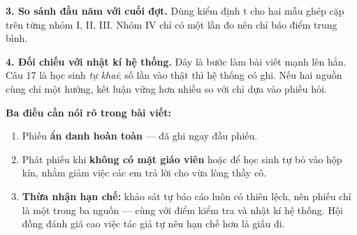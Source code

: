 \documentclass[12pt,a4paper]{article}
\begin{document}
\textbf{3. So sánh đầu năm với cuối đợt.} Dùng kiểm định t cho hai mẫu ghép cặp
trên từng nhóm I, II, III. Nhóm IV chỉ có một lần đo nên chỉ báo điểm trung
bình.

\textbf{4. Đối chiếu với nhật kí hệ thống.} Đây là bước làm bài viết mạnh lên
hẳn. Câu 17 là học sinh \textit{tự khai}; số lần vào thật thì hệ thống có ghi.
Nếu hai nguồn cùng chỉ một hướng, kết luận vững hơn nhiều so với chỉ dựa vào
phiếu hỏi.

\vspace{6pt}
\textbf{Ba điều cần nói rõ trong bài viết:}

\begin{enumerate}[leftmargin=1.1cm, itemsep=3pt]
  \item Phiếu \textbf{ẩn danh hoàn toàn} --- đã ghi ngay đầu phiếu.
  \item Phát phiếu khi \textbf{không có mặt giáo viên} hoặc để học sinh tự bỏ
        vào hộp kín, nhằm giảm việc các em trả lời cho vừa lòng thầy cô.
  \item \textbf{Thừa nhận hạn chế:} khảo sát tự báo cáo luôn có thiên lệch, nên
        phiếu chỉ là một trong ba nguồn --- cùng với điểm kiểm tra và nhật kí
        hệ thống. Hội đồng đánh giá cao việc tác giả tự nêu hạn chế hơn là giấu
        đi.
\end{enumerate}
\end{document}
